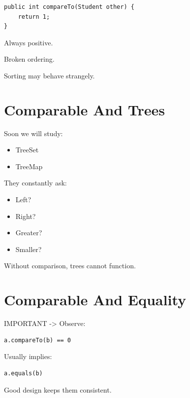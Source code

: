 \documentclass[11pt,a4paper]{book}
\begin{document}
\begin{verbatim} 
public int compareTo(Student other) {
    return 1;
}
\end{verbatim}


Always positive.

Broken ordering.

Sorting may behave strangely.

\section{Comparable And Trees}

Soon we will study:
\begin{itemize}
\item TreeSet
\item TreeMap
\end{itemize}
They constantly ask:
\begin{itemize}
\item Left?
\item Right?
\item Greater?
\item Smaller?
\end{itemize}
Without comparison,
trees cannot function.

\section{Comparable And Equality}

IMPORTANT -> Observe:
\begin{verbatim} 
a.compareTo(b) == 0
\end{verbatim}
Usually implies:
\begin{verbatim} 
a.equals(b)
\end{verbatim}

\textcolor{RosettaDeepGreen}{Good design} keeps them consistent.
\end{document}
